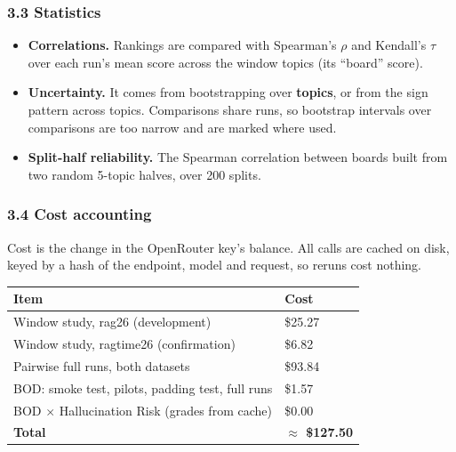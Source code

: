 \documentclass[
  10pt,
]{article}
\providecommand{\tightlist}{%
  \setlength{\itemsep}{0pt}\setlength{\parskip}{0pt}}
\begin{document}
\subsubsection{3.3 Statistics}\label{statistics}

\begin{itemize}
\tightlist
\item
  \textbf{Correlations.} Rankings are compared with Spearman's
  \ensuremath{\rho} and Kendall's \ensuremath{\tau} over each run's mean
  score across the window topics (its ``board'' score).
\item
  \textbf{Uncertainty.} It comes from bootstrapping over
  \textbf{topics}, or from the sign pattern across topics. Comparisons
  share runs, so bootstrap intervals over comparisons are too narrow and
  are marked where used.
\item
  \textbf{Split-half reliability.} The Spearman correlation between
  boards built from two random 5-topic halves, over 200 splits.
\end{itemize}

\subsubsection{3.4 Cost accounting}\label{cost-accounting}

Cost is the change in the OpenRouter key's balance. All calls are cached
on disk, keyed by a hash of the endpoint, model and request, so reruns
cost nothing.

\begin{longtable}[]{@{}
  >{\raggedright\arraybackslash}p{}
  >{\raggedright\arraybackslash}p{}@{}}
\toprule\noalign{}
\begin{minipage}[b]{\linewidth}\raggedright
Item
\end{minipage} & \begin{minipage}[b]{\linewidth}\raggedright
Cost
\end{minipage} \\
\midrule\noalign{}
\endhead
\bottomrule\noalign{}
\endlastfoot
Window study, rag26 (development) & \$25.27 \\
Window study, ragtime26 (confirmation) & \$6.82 \\
Pairwise full runs, both datasets & \$93.84 \\
BOD: smoke test, pilots, padding test, full runs & \$1.57 \\
BOD \ensuremath{\times} Hallucination Risk (grades from cache) &
\$0.00 \\
\textbf{Total} & \textbf{\ensuremath{\approx} \$127.50} \\
\end{longtable}
\end{document}

